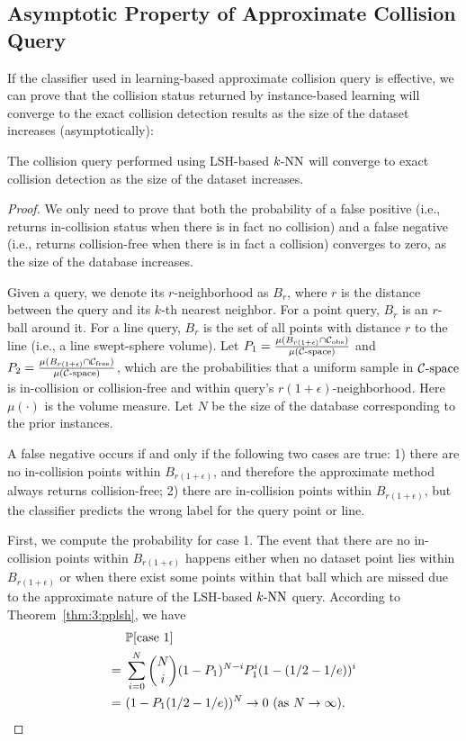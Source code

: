 \subsection{Asymptotic Property of Approximate Collision Query}
\label{subsec:3:knnreasoning:converge}
If the classifier used in learning-based approximate collision query is effective, we can prove that the collision status returned by instance-based learning will converge to the exact collision detection results as the size of the dataset increases (asymptotically):
\begin{theorem}
  \label{thm:3:conv}
  The collision query performed using LSH-based $k\text{-NN}$ will converge to exact collision detection as the size of the dataset increases.
\end{theorem}
\begin{proof}
We only need to prove that both the probability of a false positive (i.e., returns in-collision status when there is in fact no collision) and a false negative (i.e., returns collision-free when there is in fact a collision) converges to zero, as the size of the database increases.

Given a query, we denote its $r$-neighborhood as $B_r$, where $r$ is the distance between the query and its $k$-th nearest neighbor. For a point query, $B_r$ is an $r$-ball around it. For a line query, $B_r$ is the set of all points with distance $r$ to the line (i.e., a line swept-sphere volume). Let $P_1 = \frac{\mu(B_{r(1+\epsilon)} \cap \mathcal C_{\text{obs}})}{\mu(\mathcal C\text{-space})}$ and $P_2 = \frac{\mu(B_{r(1+\epsilon)} \cap \mathcal C_{\text{free}})}{\mu(\mathcal C\text{-space})}$, which are the probabilities that a uniform sample in $\mathcal C\text{-space}$ is in-collision or collision-free and within query's $r(1+\epsilon)$-neighborhood. Here $\mu(\cdot)$ is the volume measure. Let $N$ be the size of the database corresponding to the prior instances.

A false negative occurs if and only if the following two cases are true: 1) there are no in-collision points within $B_{r(1+\epsilon)}$, and therefore the approximate method always returns collision-free; 2) there are in-collision points within $B_{r(1+\epsilon)}$, but the classifier predicts the wrong label for the query point or line.

First, we compute the probability for case 1. The event that there are no in-collision points within $B_{r(1+\epsilon)}$ happens either when no dataset point lies within $B_{r(1+\epsilon)}$ or when there exist some points within that ball which are missed due to the approximate nature of the LSH-based $k\text{-NN}$ query. According to Theorem~\ref{thm:3:pplsh}, we have
\begin{align}
  &\ \mathbb P[\text{case 1}] \notag \\
  =&\ \sum_{i=0}^N \binom{N}{i} (1-P_1)^{N-i} P_1^i (1-(1/2 -1/e))^i \notag \\
  =& \ (1-P_1(1/2-1/e))^N \rightarrow 0 \ (\text{as } N \rightarrow \infty). \notag
\end{align}


\end{proof}
